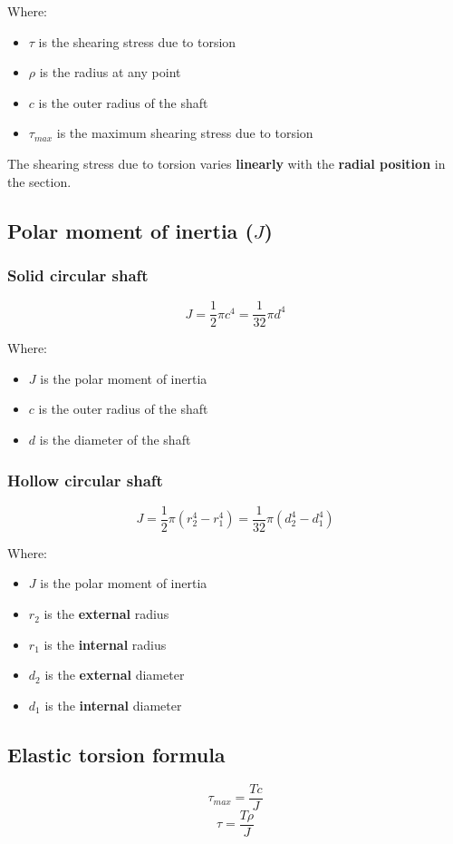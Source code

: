 \documentclass[11pt]{article}
\begin{document}
Where:
\begin{itemize}
\item \(\tau\) is the shearing stress due to torsion
\item \(\rho\) is the radius at any point
\item \(c\) is the outer radius of the shaft
\item \(\tau_{max}\) is the maximum shearing stress due to torsion
\end{itemize}

The shearing stress due to torsion varies \textbf{linearly} with the \textbf{radial position} in the section.
\subsection{Polar moment of inertia (\(J\))}
\label{sec:org0f2cae1}

\subsubsection{Solid circular shaft}
\label{sec:orgce6d73c}
\[J = \frac{1}{2}\pi c^4 = \frac{1}{32}\pi d^4\]

Where:
\begin{itemize}
\item \(J\) is the polar moment of inertia
\item \(c\) is the outer radius of the shaft
\item \(d\) is the diameter of the shaft
\end{itemize}
\subsubsection{Hollow circular shaft}
\label{sec:org3e93237}
\[J = \frac{1}{2} \pi \left(r_2^4 - r_1^4 \right) = \frac{1}{32} \pi \left(d_2^4 - d_1^4 \right)\]

Where:
\begin{itemize}
\item \(J\) is the polar moment of inertia
\item \(r_2\) is the \textbf{external} radius
\item \(r_1\) is the \textbf{internal} radius
\item \(d_2\) is the \textbf{external} diameter
\item \(d_1\) is the \textbf{internal} diameter
\end{itemize}
\subsection{Elastic torsion formula}
\label{sec:orgbdae2ca}
\[\tau_{max} = \frac{Tc}{J}\]
\[\tau = \frac{T \rho}{J}\]
\end{document}
